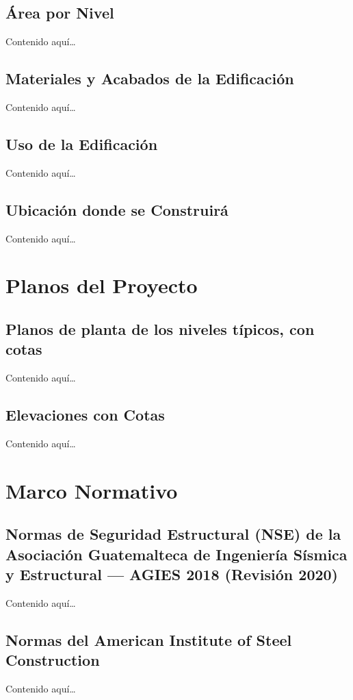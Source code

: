 \documentclass[14pt,letterpaper]{extarticle}
\begin{document}
	
	\subsection{Área por Nivel}
	Contenido aquí…
	
	\subsection{Materiales y Acabados de la Edificación}
	Contenido aquí…
	
	\subsection{Uso de la Edificación}
	Contenido aquí…
	
	\subsection{Ubicación donde se Construirá}
	Contenido aquí…
	
	
	
	
	\section{Planos del Proyecto}
	
	\subsection{Planos de planta de los niveles típicos, con cotas }
	Contenido aquí…
	
	\subsection{Elevaciones con Cotas}
	Contenido aquí…
	
	\section{Marco Normativo}
	
	\subsection{Normas de Seguridad Estructural (NSE) de la Asociación Guatemalteca de Ingeniería Sísmica y Estructural — AGIES 2018 (Revisión 2020)}
	Contenido aquí…
	
	\subsection{Normas del American Institute of Steel Construction}
	Contenido aquí…
	
\end{document}
